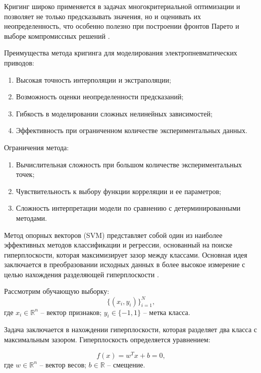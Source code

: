 Кригинг широко применяется в задачах многокритериальной оптимизации и позволяет
не только предсказывать значения, но и оценивать их неопределенность, что особенно
полезно при построении фронтов Парето и выборе компромиссных решений \cite{radaideh2020surrogate}.

Преимущества метода кригинга для моделирования электропневматических приводов:

\begin{enumerate}
    \item Высокая точность интерполяции и экстраполяции;
    \item Возможность оценки неопределенности предсказаний;
    \item Гибкость в моделировании сложных нелинейных зависимостей;
    \item Эффективность при ограниченном количестве экспериментальных данных.
\end{enumerate}

Ограничения метода:

\begin{enumerate}
    \item Вычислительная сложность при большом количестве экспериментальных точек;
    \item Чувствительность к выбору функции корреляции и ее параметров;
    \item Сложность интерпретации модели по сравнению с детерминированными методами.
\end{enumerate}

\label{sec:ch4/sec2/subsec1/subsubsec4}

Метод опорных векторов (SVM) представляет собой один из наиболее эффективных методов классификации и
регрессии, основанный на поиске гиперплоскости, которая максимизирует зазор между классами.
Основная идея заключается в преобразовании исходных данных в более
высокое измерение с целью нахождения разделяющей гиперплоскости \cite{Jakkula2006}.

Рассмотрим обучающую выборку:
\begin{equation*}
    \{(x_i, y_i)\}_{i=1}^N,
\end{equation*}
где $x_i \in \mathbb{R}^n$ -- вектор признаков;
$y_i \in \{-1, 1\}$ -- метка класса.

Задача заключается в нахождении гиперплоскости,
которая разделяет два класса с максимальным зазором. Гиперплоскость определяется уравнением:

\begin{equation*}
    f(x) = w^T x + b = 0,
\end{equation*}
где $w \in \mathbb{R}^n$ -- вектор весов;
$b \in \mathbb{R}$ -- смещение.


